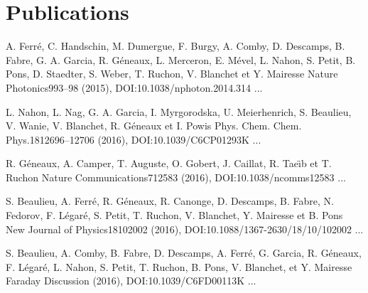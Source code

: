 \part*{Publications}




{A. Ferré, C. Handschin, M. Dumergue, F. Burgy, A. Comby, D. Descamps, B. Fabre, G. A. Garcia, R. Géneaux, L. Merceron, E. Mével, L. Nahon, S. Petit, B. Pons, D. Staedter, S. Weber, T. Ruchon, V. Blanchet et Y. Mairesse} 
{Nature Photonics}{9}{93–98 (2015), DOI:10.1038/nphoton.2014.314}
{...}
\par\noindent

{L. Nahon, L. Nag, G. A. Garcia, I. Myrgorodska, U. Meierhenrich, S. Beaulieu, V. Wanie, V. Blanchet, R. Géneaux et I. Powis} 
{Phys. Chem. Chem. Phys.}{18}{12696–12706 (2016), DOI:10.1039/C6CP01293K}
{...}
\par\noindent

{R. G\'eneaux, A. Camper, T. Auguste, O. Gobert, J. Caillat, R. Tae{\"\i}b et T. Ruchon} 
{Nature Communications}{7}{12583 (2016), DOI:10.1038/ncomms12583}
{...}
\par\noindent

{S. Beaulieu, A. Ferré, R. Géneaux, R. Canonge, D. Descamps, B. Fabre, N. Fedorov, F. Légaré, S. Petit, T. Ruchon, V. Blanchet, Y. Mairesse et B. Pons} 
{New Journal of Physics}{18}{102002 (2016), DOI:10.1088/1367-2630/18/10/102002}
{...}
\par\noindent

{S. Beaulieu, A. Comby, B. Fabre, D. Descamps, A. Ferré, G. Garcia, R. Géneaux, F. Légaré, L. Nahon, S. Petit, T. Ruchon, B. Pons, V. Blanchet, et Y. Mairesse} 
{Faraday Discussion}{ }{(2016), DOI:10.1039/C6FD00113K}
{...}
\par\noindent